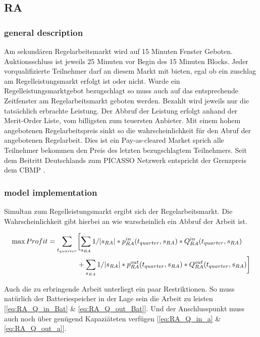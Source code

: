 \subsection{RA}
\label{subsec:RA}
\subsubsection{general description}
Am sekundären Regelarbeitsmarkt wird auf 15 Minuten Fenster Geboten. Auktionsschluss ist jeweils 25 Minuten vor Begin des 15 Minuten Blocks.
Jeder vorqualifizierte Teilnehmer darf an diesem Markt mit bieten, egal ob ein zuschlag am Regelleistungsmarkt erfolgt ist oder nicht.
Wurde ein Regelleistungsmarktgebot bezugschlagt so muss auch auf das entsprechende Zeitfenster am Regelarbeitsmarkt geboten werden.
Bezahlt wird jeweils nur die tatsächlich erbrachte Leistung. Der Abbruf der Leistung erfolgt anhand der Merit-Order Liste, vom billigsten zum teuersten Anbieter.
Mit einem hohem angebotenen Regelarbeitspreis sinkt so die wahrscheinlichkeit für den Abruf der angebotenen Regelarbeit.
Dies ist ein Pay-as-cleared Market sprich alle Teilnehmer bekommen den Preis des letzten bezugschlagtem Teilnehmers.
Seit dem Beitritt Deutschlands zum PICASSO Netzwerk entspricht der Grenzpreis dem CBMP \cite{50hertzamprionTENNETTRANSNETBW.}.
\subsubsection{model implementation}
Simultan zum Regelleistungsmarkt ergibt sich der Regelarbeitsmarkt. Die Wahrscheinlichkeit gibt hierbei an wie warscheinlich ein Abbruf der Arbeit ist.


\begin{alignat}{3}
	\max Profit =  \sum_{t_{quarter}} & \biggl[ \sum_{s_{RA}}1/|s_{RA}| * p^{in}_{RA}(t_{quarter}, s_{RA}) * Q^{in}_{RA}(t_{quarter}, s_{RA})				\notag     \\
	                                  & + \sum_{s_{RA}}1/|s_{RA}| * p^{out}_{RA}(t_{quarter}, s_{RA}) * Q^{out}_{RA}(t_{quarter}, s_{RA}) \biggr]				\notag \\
\end{alignat}

Auch die zu erbringende Arbeit unterliegt ein paar Restriktionen. So muss natürlich der Batteriespeicher in der Lage sein die Arbeit zu leisten [\ref{eq:RA_Q_in_Bat} \& \ref{eq:RA_Q_out_Bat}].
Und der Anschlusspunkt muss auch noch über genügend Kapaziäteten verfügen [\ref{eq:RA_Q_in_a} \& \ref{eq:RA_Q_out_a}].

